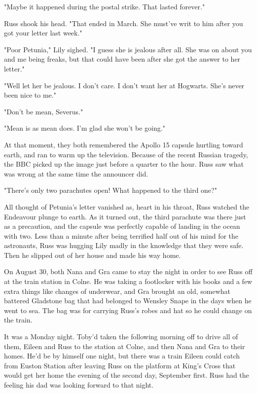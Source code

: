 \documentclass[a4paper,11pt]{article}
\begin{document}
"Maybe it happened during the postal strike. That lasted forever."

Russ shook his head. "That ended in March. She must've writ to him after you got your letter last week."

"Poor Petunia," Lily sighed. "I guess she is jealous after all. She was on about you and me being freaks, but that could have been after she got the answer to her letter."

"Well let her be jealous. I don't care. I don't want her at Hogwarts. She's never been nice to me."

"Don't be mean, Severus."

"Mean is as mean does. I'm glad she won't be going."

At that moment, they both remembered the Apollo 15 capsule hurtling toward earth, and ran to warm up the television. Because of the recent Russian tragedy, the BBC picked up the image just before a quarter to the hour. Russ saw what was wrong at the same time the announcer did.

"There's only two parachutes open! What happened to the third one?"

All thought of Petunia's letter vanished as, heart in his throat, Russ watched the Endeavour plunge to earth. As it turned out, the third parachute was there just as a precaution, and the capsule was perfectly capable of landing in the ocean with two. Less than a minute after being terrified half out of his mind for the astronauts, Russ was hugging Lily madly in the knowledge that they were safe. Then he slipped out of her house and made his way home.

On August 30, both Nana and Gra came to stay the night in order to see Russ off at the train station in Colne. He was taking a footlocker with his books and a few extra things like changes of underwear, and Gra brought an old, somewhat battered Gladstone bag that had belonged to Wensley Snape in the days when he went to sea. The bag was for carrying Russ's robes and hat so he could change on the train.

It was a Monday night. Toby'd taken the following morning off to drive all of them, Eileen and Russ to the station at Colne, and then Nana and Gra to their homes. He'd be by himself one night, but there was a train Eileen could catch from Euston Station after leaving Russ on the platform at King's Cross that would get her home the evening of the second day, September first. Russ had the feeling his dad was looking forward to that night.
\end{document}
